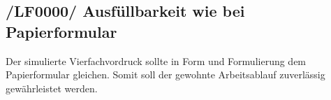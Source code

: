 \subsection{/LF0000/ Ausfüllbarkeit wie bei Papierformular}
Der simulierte Vierfachvordruck sollte in Form und Formulierung dem Papierformular gleichen. Somit soll der gewohnte Arbeitsablauf zuverlässig gewährleistet werden. 